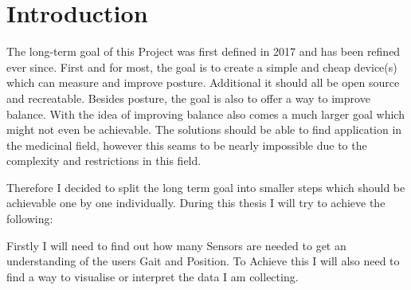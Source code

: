 \chapter*{Introduction}
\label{chap:Introduction}
\renewcommand{\thesection}{\arabic{section}}
\setcounter{section}{0}

The long-term goal of this Project was first defined in 2017 and has been refined ever since. First and for most, the goal is to create a simple and cheap device(s) which can measure and improve posture. Additional it should all be open source and recreatable. Besides posture, the goal is also to offer a way to improve balance. 
With the idea of improving balance also comes a much larger goal which might not even be achievable. The solutions should be able to find application in the medicinal field, however this seams to be nearly impossible due to the complexity and restrictions in this field. 

Therefore I decided to split the long term goal into smaller steps which should be achievable one by one individually. During this thesis I will try to achieve the following:

Firstly I will need to find out how many Sensors are needed to get an understanding of the users Gait and Position. To Achieve this I will also need to find a way to visualise or interpret the data I am collecting.
